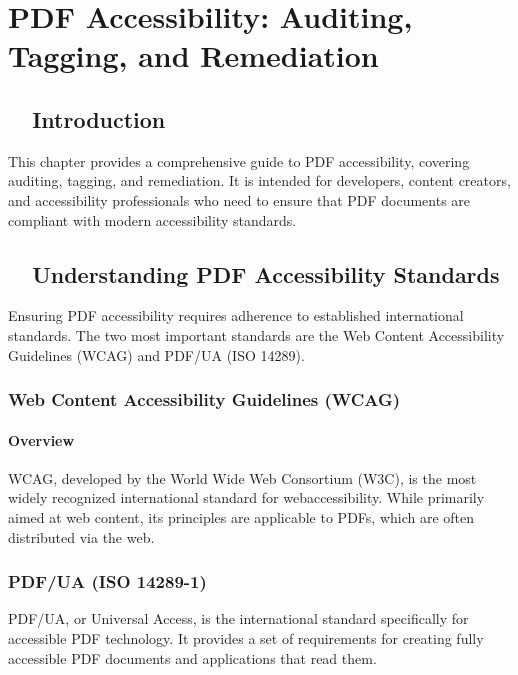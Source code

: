 \chapter{PDF Accessibility: Auditing, Tagging, and Remediation}
\label{chap:pdf-accessibility-report}

\section{~~Introduction}
\label{sec:pdf-report-introduction}
This chapter provides a comprehensive guide to PDF accessibility, covering auditing, tagging, and remediation. It is intended for developers, content creators, and accessibility professionals who need to ensure that PDF documents are compliant with modern accessibility standards.

\section{~~Understanding PDF Accessibility Standards}
\label{sec:pdf-accessibility-standards}
Ensuring PDF accessibility requires adherence to established international standards. The two most important standards are the Web Content Accessibility Guidelines (WCAG) and PDF/UA (ISO 14289).

\subsection{Web Content Accessibility Guidelines (WCAG)}
\label{subsec:wcag-pdf}

\subsubsection{Overview}
\label{ssubsec:wcag-pdf-overview}
\gls{WCAG}, developed by the World Wide Web Consortium (W3C), is the most widely recognized international standard for \gls{webaccessibility}. While primarily aimed at web content, its principles are applicable to PDFs, which are often distributed via the web.

\subsection{PDF/UA (ISO 14289-1)}
\label{subsec:pdf-ua}
PDF/UA, or Universal Access, is the international standard specifically for accessible PDF technology. It provides a set of requirements for creating fully accessible PDF documents and applications that read them.

